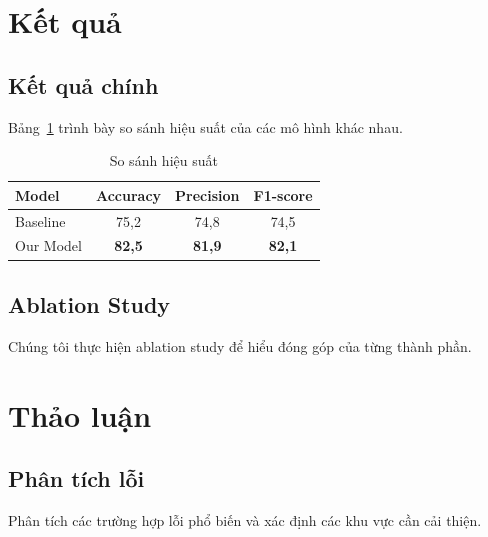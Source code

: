 \section{Kết quả}

\subsection{Kết quả chính}

Bảng~\ref{tab:results} trình bày so sánh hiệu suất của các mô hình khác nhau.

\begin{table}[H]
\centering
\caption{So sánh hiệu suất}
\label{tab:results}
\begin{tabular}{lccc}
\toprule
Model & Accuracy & Precision & F1-score \\
\midrule
Baseline & 75,2 & 74,8 & 74,5 \\
Our Model & \textbf{82,5} & \textbf{81,9} & \textbf{82,1} \\
\bottomrule
\end{tabular}
\end{table}

\subsection{Ablation Study}

Chúng tôi thực hiện ablation study để hiểu đóng góp của từng thành phần.

\section{Thảo luận}

\subsection{Phân tích lỗi}

Phân tích các trường hợp lỗi phổ biến và xác định các khu vực cần cải thiện.
